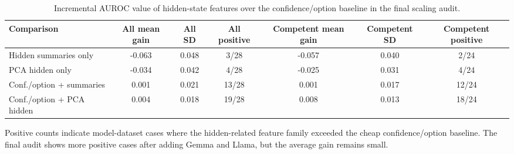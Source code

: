 \begin{table}[t]
\centering
\small
\caption{Incremental AUROC value of hidden-state features over the confidence/option baseline in the final scaling audit.}
\label{tab:hidden-gain}
\begin{threeparttable}
\begin{adjustbox}{width=\textwidth}
\begin{tabular}{lcccccc}
\toprule
Comparison & All mean gain & All SD & All positive & Competent mean gain & Competent SD & Competent positive \\
\midrule
Hidden summaries only & -0.063 & 0.048 & 3/28 & -0.057 & 0.040 & 2/24 \\
PCA hidden only & -0.034 & 0.042 & 4/28 & -0.025 & 0.031 & 4/24 \\
Conf./option + summaries & 0.001 & 0.021 & 13/28 & 0.001 & 0.017 & 12/24 \\
Conf./option + PCA hidden & 0.004 & 0.018 & 19/28 & 0.008 & 0.013 & 18/24 \\
\bottomrule
\end{tabular}
\end{adjustbox}

\begin{tablenotes}[flushleft]\footnotesize\item \parbox{0.95\textwidth}{Positive counts indicate model-dataset cases where the hidden-related feature family exceeded the cheap confidence/option baseline. The final audit shows more positive cases after adding Gemma and Llama, but the average gain remains small.}\end{tablenotes}
\end{threeparttable}
\end{table}
